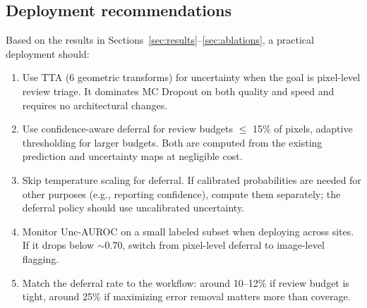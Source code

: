 \subsection{Deployment recommendations}

Based on the results in Sections~\ref{sec:results}--\ref{sec:ablations},
a practical deployment should:

\begin{enumerate}[leftmargin=*]
\item Use TTA (6 geometric transforms) for uncertainty when the goal is
pixel-level review triage. It dominates MC Dropout on both quality and speed
and requires no architectural changes.

\item Use confidence-aware deferral for review budgets $\leq$ 15\% of pixels,
adaptive thresholding for larger budgets. Both are computed from the existing
prediction and uncertainty maps at negligible cost.

\item Skip temperature scaling for deferral. If calibrated probabilities are
needed for other purposes (e.g., reporting confidence), compute them
separately; the deferral policy should use uncalibrated uncertainty.

\item Monitor Unc-AUROC on a small labeled subset when deploying across sites.
If it drops below $\sim$0.70, switch from pixel-level deferral to image-level
flagging.

\item Match the deferral rate to the workflow: around 10--12\% if review
budget is tight, around 25\% if maximizing error removal matters more than
coverage.
\end{enumerate}

